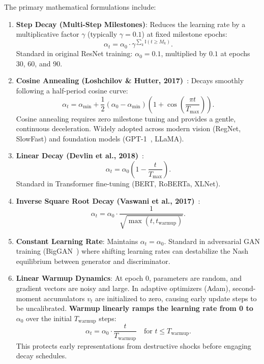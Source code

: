The primary mathematical formulations include:
\begin{enumerate}[leftmargin=*]
  \item \textbf{Step Decay (Multi-Step Milestones)}:
    Reduces the learning rate by a multiplicative factor $\gamma$ (typically $\gamma = 0.1$) at fixed milestone epochs:
    \begin{equation}
    \alpha_t = \alpha_0 \cdot \gamma^{\sum_k \mathbb{I}(t \ge M_k)}.
    \end{equation}
    Standard in original ResNet training: $\alpha_0 = 0.1$, multiplied by $0.1$ at epochs 30, 60, and 90.
  \item \textbf{Cosine Annealing (Loshchilov \& Hutter, 2017)}~\cite{loshchilov2017sgdr}:
    Decays smoothly following a half-period cosine curve:
    \begin{equation}
    \alpha_t = \alpha_{\min} + \frac{1}{2}(\alpha_0 - \alpha_{\min}) \left( 1 + \cos\left( \frac{\pi t}{T_{\max}} \right) \right).
    \label{eq:cosine_annealing_formula}
    \end{equation}
    Cosine annealing requires zero milestone tuning and provides a gentle, continuous deceleration. Widely adopted across modern vision (RegNet, SlowFast) and foundation models (GPT-1~\cite{radford2018improving}, LLaMA).
  \item \textbf{Linear Decay (Devlin et al., 2018)}~\cite{devlin2019bert}:
    \begin{equation}
    \alpha_t = \alpha_0 \left( 1 - \frac{t}{T_{\max}} \right).
    \end{equation}
    Standard in Transformer fine-tuning (BERT, RoBERTa, XLNet).
  \item \textbf{Inverse Square Root Decay (Vaswani et al., 2017)}~\cite{vaswani2017attention}:
    \begin{equation}
    \alpha_t = \alpha_0 \cdot \frac{1}{\sqrt{\max(t, t_{\text{warmup}})}}.
    \end{equation}
  \item \textbf{Constant Learning Rate}:
    Maintains $\alpha_t = \alpha_0$. Standard in adversarial GAN training (BigGAN~\cite{brock2019large}) where shifting learning rates can destabilize the Nash equilibrium between generator and discriminator.
  \item \textbf{Linear Warmup Dynamics}:
    At epoch 0, parameters are random, and gradient vectors are noisy and large. In adaptive optimizers (Adam), second-moment accumulators $v_t$ are initialized to zero, causing early update steps to be uncalibrated. \textbf{Warmup linearly ramps the learning rate from 0 to $\alpha_0$} over the initial $T_{\text{warmup}}$ steps:
    \begin{equation}
    \alpha_t = \alpha_0 \cdot \frac{t}{T_{\text{warmup}}} \quad \text{for } t \le T_{\text{warmup}}.
    \end{equation}
    This protects early representations from destructive shocks before engaging decay schedules.
\end{enumerate}

